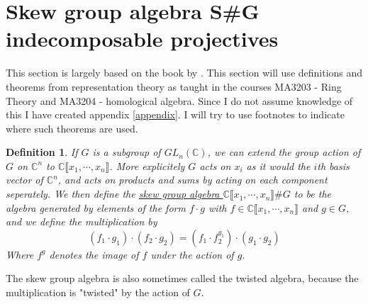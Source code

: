 \documentclass[11pt, a4paper, english]{article}
\numberwithin{prop}{section}
\numberwithin{lemma}{section}
\numberwithin{theorem}{section}
\newtheorem{defin}{Definition}
\numberwithin{defin}{section}
\numberwithin{example}{section}
\newcommand{\C}{\mathbb{C}}
\begin{document}
\section{Skew group algebra S\#G indecomposable projectives}
This section is largely based on the book by \cite{CMR}. This section will use definitions and theorems from representation theory as taught in the courses MA3203 - Ring Theory and MA3204 - homological algebra. Since I do not assume knowledge of this I have created appendix \ref{appendix}. I will try to use footnotes to indicate where such theorems are used.

\begin{defin}
If $G$ is a subgroup of $GL_n(\C)$, we can extend the group action of $G$ on $\C^n$ to $\C\llbracket x_1, \cdots, x_n\rrbracket$. More explicitely $G$ acts on $x_i$ as it would the $i$th basis vector of $\C^n$, and acts on products and sums by acting on each component seperately. We then define the \underline{skew group algebra $\C \llbracket x_1, \cdots, x_n \rrbracket \# G$} to be the algebra generated by elements of the form $f \cdot g$ with $f \in \C\llbracket x_1, \cdots, x_n\rrbracket$ and $g \in G$, and we define the multiplication by
$$ (f_1 \cdot g_1) \cdot (f_2 \cdot g_2) = (f_1 \cdot f_2^{g_1}) \cdot (g_1 \cdot g_2) $$
Where $f^g$ denotes the image of $f$ under the action of $g$.
\end{defin}

The skew group algebra is also sometimes called the twisted algebra, because the multiplication is "twisted" by the action of $G$.
\end{document}
